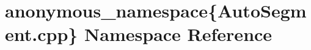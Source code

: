 \hypertarget{namespaceanonymous__namespace_02AutoSegment_8cpp_03}{}\section{anonymous\+\_\+namespace\{Auto\+Segment.\+cpp\} Namespace Reference}
\label{namespaceanonymous__namespace_02AutoSegment_8cpp_03}
